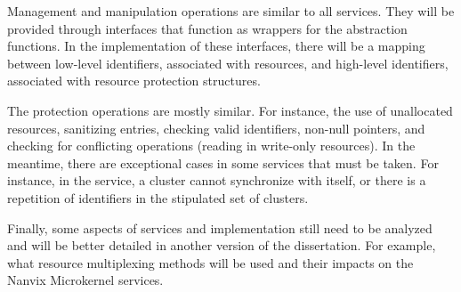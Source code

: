 			Management and manipulation operations are similar to all services.
			They will be provided through interfaces that function as wrappers
			for the \hal abstraction functions.
			In the implementation of these interfaces, there will be a mapping
			between low-level identifiers, associated with \hal resources,
			and high-level identifiers, associated with resource protection structures.


			The protection operations are mostly similar.
			For instance, the use of unallocated resources, sanitizing entries,
			checking valid identifiers, non-null pointers, and checking
			for conflicting operations (reading in write-only resources).
			In the meantime, there are exceptional cases in some services
			that must be taken.
			For instance, in the \sync service, a cluster cannot synchronize
			with itself, or there is a repetition of identifiers in the
			stipulated set of clusters.

			Finally, some aspects of services and implementation still need
			to be analyzed and will be better detailed in another version
			of the dissertation.
			For example, what resource multiplexing methods will be used
			and their impacts on the Nanvix Microkernel services.